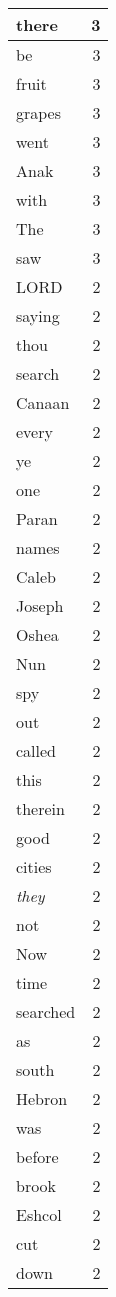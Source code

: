 \begin{center}
\begin{longtable}{l|r}
there & 3\\ \hline 
be & 3\\ \hline 
fruit & 3\\ \hline 
grapes & 3\\ \hline 
went & 3\\ \hline 
Anak & 3\\ \hline 
with & 3\\ \hline 
The & 3\\ \hline 
saw & 3\\ \hline 
LORD & 2\\ \hline 
saying & 2\\ \hline 
thou & 2\\ \hline 
search & 2\\ \hline 
Canaan & 2\\ \hline 
every & 2\\ \hline 
ye & 2\\ \hline 
one & 2\\ \hline 
Paran & 2\\ \hline 
names & 2\\ \hline 
Caleb & 2\\ \hline 
Joseph & 2\\ \hline 
Oshea & 2\\ \hline 
Nun & 2\\ \hline 
spy & 2\\ \hline 
out & 2\\ \hline 
called & 2\\ \hline 
this & 2\\ \hline 
therein & 2\\ \hline 
good & 2\\ \hline 
cities & 2\\ \hline 
\emph{they} & 2\\ \hline 
not & 2\\ \hline 
Now & 2\\ \hline 
time & 2\\ \hline 
searched & 2\\ \hline 
as & 2\\ \hline 
south & 2\\ \hline 
Hebron & 2\\ \hline 
was & 2\\ \hline 
before & 2\\ \hline 
brook & 2\\ \hline 
Eshcol & 2\\ \hline 
cut & 2\\ \hline 
down & 2\\ \hline 

\end{longtable}
\end{center}
